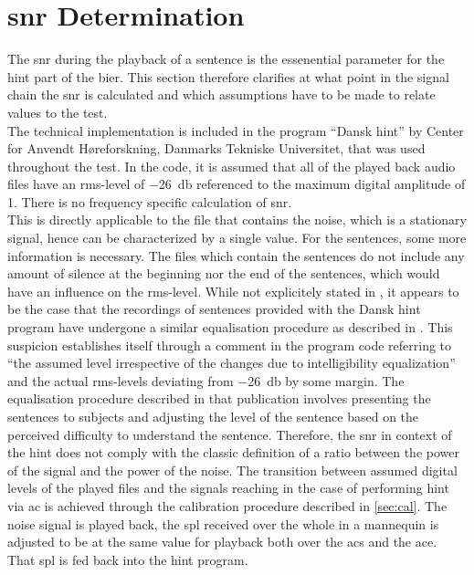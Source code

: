 \section{\gls{snr} Determination}
The \gls{snr} during the playback of a sentence is the essenential parameter for the \gls{hint} part of the \gls{bier}.
This section therefore clarifies at what point in the signal chain the \gls{snr} is calculated and which assumptions have to be made to relate values to the test.\\
The technical implementation is included in the \matlab program \enquote{Dansk \gls{hint}} by Center for Anvendt Høreforskning, Danmarks Tekniske Universitet, that was used throughout the test.
In the code, it is assumed that all of the played back audio files have an \gls{rms}-level of \SI{-26}{\decibel} referenced to the maximum digital amplitude of 1. There is no frequency specific calculation of \gls{snr}.\\
This is directly applicable to the file that contains the noise, which is a stationary signal, hence can be characterized by a single value.
For the sentences, some more information is necessary. The files which contain the sentences do not include any amount of silence at the beginning nor the end of the sentences, which would have an influence on the \gls{rms}-level.
While not explicitely stated in \citep{hint_2011}, it appears to be the case that the recordings of sentences provided with the Dansk \gls{hint} program have undergone a similar equalisation procedure as described in \citep{nielsen_dau_09}. 
This suspicion establishes itself through a comment in the program code referring to \enquote{the assumed level irrespective of the changes due to intelligibility equalization} and the actual \gls{rms}-levels deviating from \SI{-26}{\decibel} by some margin.
The equalisation procedure described in that publication involves presenting the sentences to subjects and adjusting the level of the sentence based on the perceived difficulty to understand the sentence.
Therefore, the \gls{snr} in context of the \gls{hint} does not comply with the classic definition of a ratio between the power of the signal and the power of the noise.
The transition between assumed digital levels of the played files and the signals reaching in the case of performing \gls{hint} via \gls{ac} is achieved through the calibration procedure described in \autoref{sec:cal}. The noise signal is played back, the \gls{spl} received over the whole in a mannequin is adjusted  to be at the same value for playback both over the \gls{acs} and the \gls{ace}. That \gls{spl} is fed back into the \gls{hint} \matlab program.
